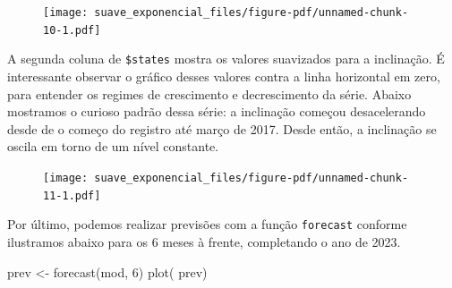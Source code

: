 \documentclass[
  letterpaper,
  DIV=11,
  numbers=noendperiod]{scrreprt}
\newenvironment{Shaded}{\begin{snugshade}}{\end{snugshade}}
\newcommand{\AttributeTok}[1]{\textcolor[rgb]{0.40,0.45,0.13}{#1}}
\newcommand{\DecValTok}[1]{\textcolor[rgb]{0.68,0.00,0.00}{#1}}
\newcommand{\FunctionTok}[1]{\textcolor[rgb]{0.28,0.35,0.67}{#1}}
\newcommand{\NormalTok}[1]{\textcolor[rgb]{0.00,0.23,0.31}{#1}}
\newcommand{\OtherTok}[1]{\textcolor[rgb]{0.00,0.23,0.31}{#1}}
\newcommand{\SpecialCharTok}[1]{\textcolor[rgb]{0.37,0.37,0.37}{#1}}
\newcommand{\StringTok}[1]{\textcolor[rgb]{0.13,0.47,0.30}{#1}}
\theoremstyle{definition}
\theoremstyle{plain}
\theoremstyle{definition}
\theoremstyle{plain}
\theoremstyle{remark}
\begin{document}
\begin{figure}[H]

{\centering \texttt{[image: suave\_exponencial\_files/figure-pdf/unnamed-chunk-10-1.pdf]}

}

\end{figure}

A segunda coluna de \texttt{\$states} mostra os valores suavizados para
a inclinação. É interessante observar o gráfico desses valores contra a
linha horizontal em zero, para entender os regimes de crescimento e
decrescimento da série. Abaixo mostramos o curioso padrão dessa série: a
inclinação começou desacelerando desde de o começo do registro até março
de 2017. Desde então, a inclinação se oscila em torno de um nível
constante.

\begin{Shaded}
\end{Shaded}

\begin{figure}[H]

{\centering \texttt{[image: suave\_exponencial\_files/figure-pdf/unnamed-chunk-11-1.pdf]}

}

\end{figure}

Por último, podemos realizar previsões com a função \texttt{forecast}
conforme ilustramos abaixo para os 6 meses à frente, completando o ano
de 2023.

\begin{Shaded}
\begin{Highlighting}[]
\NormalTok{prev }\OtherTok{\textless{}{-}} \FunctionTok{forecast}\NormalTok{(mod, }\DecValTok{6}\NormalTok{)}
\FunctionTok{plot}\NormalTok{( prev)}
\end{Highlighting}
\end{Shaded}
\end{document}
